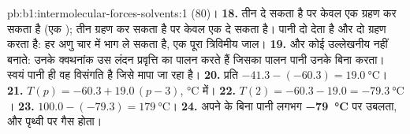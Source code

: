 \begin{solution}{pb:b1:intermolecular-forces-solvents:1}
 (80)।
\textbf{18.}  तीन दे सकता है पर केवल एक ग्रहण कर सकता है (एक );
 तीन ग्रहण कर सकता है पर केवल एक दे सकता है। पानी दो देता है और दो ग्रहण
करता है: हर अणु चार  में भाग ले सकता है, एक पूरा
त्रिविमीय जाल।
\textbf{19.}  और  कोई उल्लेखनीय  नहीं बनाते:
उनके क्वथनांक उस लंदन प्रवृत्ति का पालन करते हैं जिसका पालन पानी
उनके बिना करता। स्वयं पानी ही वह विसंगति है जिसे मापा जा रहा है।
\textbf{20.} प्रति  $-41.3 - (-60.3) = \qty{19.0}{\celsius}$।
\textbf{21.} $T(p) = -60.3 + 19.0\,(p - 3)$, \unit{\celsius} में।
\textbf{22.} $T(2) = -60.3 - 19.0 = \qty{-79.3}{\celsius}$।
\textbf{23.} $100.0 - (-79.3) = \qty{179}{\celsius}$।
\textbf{24.} अपने  के बिना पानी लगभग
\textbf{\qty{-79}{\celsius}} पर उबलता, और पृथ्वी पर गैस होता।
\end{solution}
